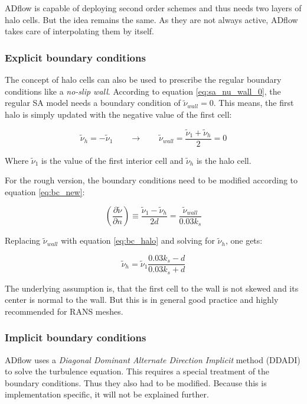 ADflow is capable of deploying second order schemes and thus needs two layers of
halo cells. But the idea remains the same. As they are not always active, ADflow
takes care of interpolating them by itself.

\subsubsection{Explicit boundary conditions}
The concept of halo cells can also be used to prescribe the regular boundary
conditions like a \textit{no-slip wall}. According to equation
\ref{eq:sa_nu_wall_0}, the regular SA model needs a boundary condition of
$\tilde \nu_{wall} = 0$. This means, the first halo is simply updated with the
negative value of the first cell:

\begin{equation}
  \tilde \nu_{h} = - \tilde \nu_{1} \qquad \rightarrow \qquad
  \tilde \nu_{wall} = \frac{\tilde \nu_{1} + \tilde \nu_{h}}{2} = 0
  \label{eq:bc_halo}
\end{equation}

\noindent Where $\tilde \nu_{1}$ is the value of the first interior cell and
$\tilde \nu_{h}$ is the halo cell.

For the rough version, the boundary conditions need to be modified according to
equation \ref{eq:bc_new}:

\begin{equation}
  \left( \frac{\partial \tilde \nu}{\partial n} \right) \equiv
  \frac{\tilde \nu_{1} - \tilde \nu_{h}}{2d} =
  \frac{\tilde \nu_{wall}}{0.03 k_{s}}
\end{equation}

\noindent Replacing $\tilde \nu_{wall}$ with equation \ref{eq:bc_halo} and
solving for $\tilde \nu_{h}$, one gets:

\begin{equation}
  \tilde \nu_{h} = \tilde \nu_{1} \frac{0.03 k_{s} - d}{0.03 k_{s} + d}
\end{equation}

\noindent The underlying assumption is, that the first cell to the wall is not
skewed and its center is normal to the wall. But this is in general good practice
and highly recommended for RANS meshes.


\subsubsection{Implicit boundary conditions}
ADflow uses a \textit{Diagonal Dominant Alternate Direction Implicit} method
(DDADI) to solve the turbulence equation. This requires a special treatment of
the boundary conditions. Thus they also had to be modified. Because this is
implementation specific, it will not be explained further.

